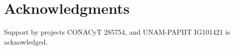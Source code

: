 \documentclass[10pt,letterpaper]{article} %
\begin{document}
\section{Acknowledgments} %
Support by projects CONACyT 285754, and UNAM-PAPIIT IG101421 is acknowledged. 






%
%

\appendix
\end{document}
